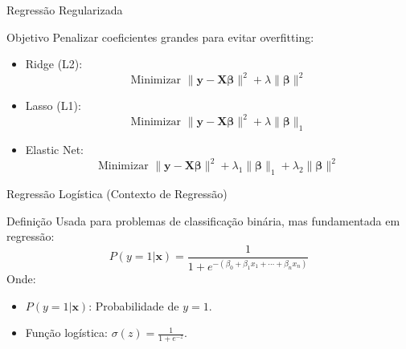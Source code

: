 \documentclass[]{beamer}
\begin{document}
\begin{frame}{Regressão Regularizada}
\footnotesize
  \begin{block}{Objetivo}
    Penalizar coeficientes grandes para evitar overfitting:
    \begin{itemize}
      \item Ridge (L2):
        \[
        \text{Minimizar } \|\mathbf{y} - \mathbf{X}\boldsymbol{\beta}\|^2 + \lambda \|\boldsymbol{\beta}\|^2
        \]
      \item Lasso (L1):
        \[
        \text{Minimizar } \|\mathbf{y} - \mathbf{X}\boldsymbol{\beta}\|^2 + \lambda \|\boldsymbol{\beta}\|_1
        \]
      \item Elastic Net:
        \[
        \text{Minimizar } \|\mathbf{y} - \mathbf{X}\boldsymbol{\beta}\|^2 + \lambda_1 \|\boldsymbol{\beta}\|_1 + \lambda_2 \|\boldsymbol{\beta}\|^2
        \]
    \end{itemize}
  \end{block}

\end{frame}

\begin{frame}{Regressão Logística (Contexto de Regressão)}
\footnotesize
  \begin{block}{Definição}
    Usada para problemas de classificação binária, mas fundamentada em regressão:
    \[
    P(y=1 | \mathbf{x}) = \frac{1}{1 + e^{-(\beta_0 + \beta_1 x_1 + \cdots + \beta_n x_n)}}
    \]
    Onde:
    \begin{itemize}
      \item \( P(y=1 | \mathbf{x}) \): Probabilidade de \( y = 1 \).
      \item Função logística: \( \sigma(z) = \frac{1}{1 + e^{-z}} \).
    \end{itemize}
  \end{block}

  \begin{figure}[ht]
    \centering

  \end{figure}
\end{frame}
\end{document}
